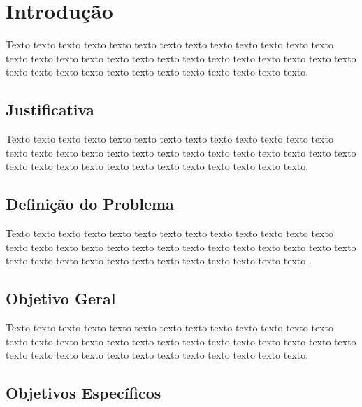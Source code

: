 \chapter{Introdução}


Texto texto texto texto texto texto texto texto texto texto texto texto texto texto texto texto texto texto texto texto texto texto texto texto texto texto texto texto texto texto texto texto texto texto texto texto texto texto texto. 


\section{Justificativa}

Texto texto texto texto texto texto texto texto texto texto texto texto texto texto texto texto texto texto texto texto texto texto texto texto texto texto texto texto texto texto texto texto texto texto texto texto texto texto texto.

\section{Definição do Problema}

Texto texto texto texto texto texto texto texto texto texto texto texto texto texto texto texto texto texto texto texto texto texto texto texto texto texto texto texto texto texto texto texto texto texto texto texto texto texto texto \cite{ref:vazquez}.

\section{Objetivo Geral}

Texto texto texto texto texto texto texto texto texto texto texto texto texto texto texto texto texto texto texto texto texto texto texto texto texto texto texto texto texto texto texto texto texto texto texto texto texto texto texto.

\section{Objetivos Específicos}


